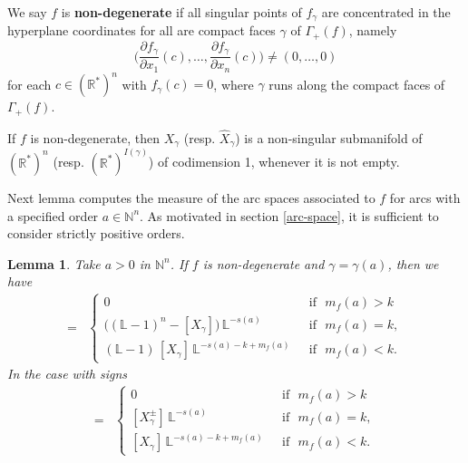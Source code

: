 \documentclass[12pt,a4paper,leqno]{amsart}
\newtheorem{lem}[thm]{Lemma}
\theoremstyle{definition}
\begin{document}
We say $f$ is \textbf{non-degenerate} if all singular points of
$f_\gamma$ are concentrated in the hyperplane coordinates for all are
compact faces $\gamma$ of $\Gamma_+(f)$, namely
$$
\biggl(
{\frac{\partial{f_\gamma}}{\partial{x_1}}}(c),\dots,{\frac{\partial{f_\gamma}}{\partial{x_n}}}(c)
\biggr)\ne(0,\dots,0)
$$
for each $c\in ({\mathbb{R}}^*)^n$ with $f_\gamma(c)=0$, where $\gamma$ runs
along the compact faces of $\Gamma_+(f)$.

If $f$ is non-degenerate, 
then $X_\gamma$ (resp. $\widehat{X}_\gamma$) is a non-singular 
submanifold of $({\mathbb{R}}^*)^n$ (resp. $({\mathbb{R}}^*)^{I(\gamma)}$) 
of codimension 1, whenever it is not empty.

Next lemma computes the measure of the arc spaces associated to $f$
for arcs with a specified order $a\in \mathbb N^n$. As motivated in
section \ref{arc-space}, it is sufficient to consider strictly positive orders.

\begin{lem}\label{KeyLem}
Take $a>0$ in $\mathbb N^n$.
If $f$ is non-degenerate and $\gamma=\gamma(a)$, then we have 
\begin{align*}
[\mathcal L_a\cap \mathcal A_k(f)]=&
\begin{cases}
0&\textrm{~~if~~}m_f(a)>k\\
\bigl(({\mathbb{L}}-1)^n-[X_{\gamma}]\bigr)\, 
{\mathbb{L}}^{-s(a)}&\textrm{~~if~~}m_f(a)=k,\\
({\mathbb{L}}-1)\,[X_{\gamma}]\,{\mathbb{L}}^{-s(a)-k+m_f(a)}&\textrm{~~if~~}m_f(a)<k.
\end{cases}
\end{align*}
In the case with signs
\begin{align*}
[\mathcal L_a\cap \mathcal A^\pm_k(f)]=&
\begin{cases}
0&\textrm{~~if~~}m_f(a)>k\\
[X^\pm_{\gamma}]\,{\mathbb{L}}^{-s(a)}&\textrm{~~if~~}m_f(a)=k,\\
[X_{\gamma}]\,{\mathbb{L}}^{-s(a)-k+m_f(a)}&\textrm{~~if~~}m_f(a)<k.
\end{cases}
\end{align*}
\end{lem}
\end{document}
